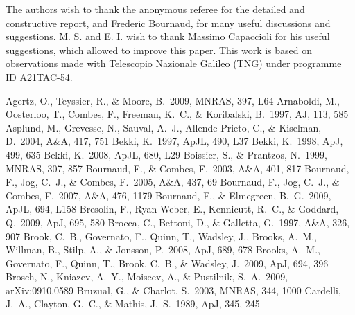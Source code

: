 \documentclass{aa}
\begin{document}
\begin{acknowledgements}
The authors wish to thank the anonymous referee for the detailed and
constructive report, and Frederic Bournaud, for many useful discussions and
suggestions. M. S. and E. I. wish to thank Massimo Capaccioli for his
useful suggestions, which allowed to improve this paper. This work is
based on observations made with Telescopio Nazionale Galileo (TNG)
under programme ID A21TAC-54.
\end{acknowledgements}

%
%

\begin{thebibliography}{}
 Agertz, O., Teyssier,
R., \& Moore, B.\ 2009, MNRAS, 397, L64
 Arnaboldi, M., Oosterloo, T.,
  Combes, F., Freeman, K.~C., \& Koribalski, B.\ 1997, AJ, 113, 585
 Asplund, M., Grevesse, N.,
  Sauval, A.~J., Allende Prieto, C., \& Kiselman, D.\ 2004, A\&A, 417,
  751
 Bekki, K.\ 1997, ApJL, 490, L37
 Bekki, K.\ 1998, ApJ, 499, 635
 Bekki, K.\ 2008, ApJL, 680, L29
 Boissier, S., \& Prantzos, N.\ 1999, MNRAS, 307, 857
 Bournaud, F., \& Combes,
  F.\ 2003, A\&A, 401, 817
 Bournaud, F., Jog, C.~J., \&
  Combes, F.\ 2005, A\&A, 437, 69
 Bournaud, F., Jog, C.~J., \& Combes, F.\ 2007, A\&A, 476, 1179
 Bournaud, F., \&
  Elmegreen, B.~G.\ 2009, ApJL, 694, L158
 Bresolin, F.,
Ryan-Weber, E., Kennicutt, R.~C., \& Goddard, Q.\ 2009, ApJ, 695, 580
 Brocca, C., Bettoni, D., \& Galletta, G.\ 1997, A\&A, 326, 907
 Brook, C.~B., Governato,
F., Quinn, T., Wadsley, J., Brooks, A.~M., Willman, B., Stilp, A.,
\& Jonsson, P.\ 2008, ApJ, 689, 678
 Brooks, A.~M.,
Governato, F., Quinn, T., Brook, C.~B.,
\& Wadsley, J.\ 2009, ApJ, 694, 396
 Brosch, N., Kniazev, A.~Y.,
  Moiseev, A., \& Pustilnik, S.~A.\ 2009, arXiv:0910.0589
 Bruzual, G., \& Charlot, S.\ 2003, MNRAS, 344, 1000
 Cardelli, J.~A.,
Clayton, G.~C., \& Mathis, J.~S.\ 1989, ApJ, 345, 245

\end{thebibliography}
\end{document}
